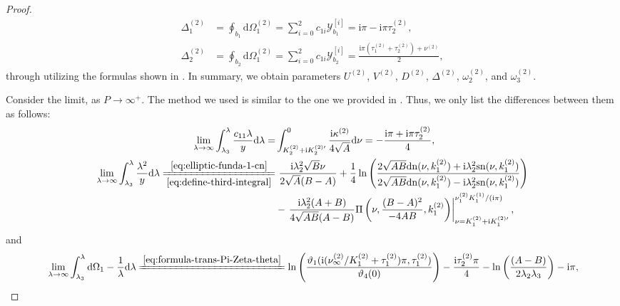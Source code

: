 \documentclass[11pt,reqno]{amsart}
\newcommand{\ii}{\mathrm{i}}
\newcommand{\sn}{\mathrm{sn}}
\newcommand{\dn}{\mathrm{dn}}
\newcommand{\dd}{\mathrm{d}}
\numberwithin{equation}{section}
\begin{document}
\begin{proof}
	\begin{equation}\nonumber
	\begin{split}
	\Delta_1^{(2)}&=\oint_{b_1}\dd\Omega_1^{(2)}=\sum_{i=0}^{2}c_{1i}\mathcal{Y}_{b_1}^{[i]}
	=\ii \pi -\ii \pi \tau^{(2)}_2 \! , \\
	\Delta_2^{(2)}&=\oint_{b_2}\dd\Omega_1^{(2)}
	=\sum_{i=0}^{2}c_{1i}\mathcal{Y}_{b_2}^{[i]}
	=\frac{ \ii \pi(\tau^{(2)}_1+\tau^{(2)}_2)+\nu^{(2)}}{2}, 
	\end{split}
	\end{equation}
	through utilizing the formulas shown in \cite{ByrdF-54}.
	In summary, we obtain parameters $U^{(2)}$, $V^{(2)}$, $D^{(2)}$, $\Delta^{(2)}$, $\omega_2^{(2)} $, and $\omega_3^{(2)}$.	
	
	Consider the limit, as $P\rightarrow \infty^{+}$. 
	The method we used is similar to the one we provided in . 
	Thus, we only list the differences between them as follows:
	\begin{equation}\nonumber
		\begin{split}
			\lim_{\lambda\rightarrow \infty}\int_{\lambda_3}^{\lambda}\frac{c_{11}\lambda}{y} \dd \lambda
			=& \int_{  K^{(2)}_2+\ii   K^{(2)\prime}_2}^{0}\frac{\ii \kappa^{(2)}}{4\sqrt{A}}\dd \nu
			=-\frac{\ii \pi+\ii \pi \tau^{(2)}_2}{4},\\
			\lim_{\lambda\rightarrow \infty} 
			\int_{\lambda_3}^{\lambda} \frac{\lambda^2}{y}\dd \lambda
			\xlongequal[\eqref{eq:define-third-integral}]{\eqref{eq:elliptic-funda-1-cn}} 
			& \ \frac{\ii \lambda_2^2\sqrt{B} \nu}{2\sqrt{A}(B-A)}+\frac{1}{4}\ln\left(\frac{2\sqrt{AB}\dn(\nu,  k^{(2)}_1)+\ii \lambda_2^2\sn(\nu,  k^{(2)}_1)}{2\sqrt{AB}\dn(\nu,  k^{(2)}_1)-\ii \lambda_2^2\sn(\nu,  k^{(2)}_1)}\right)\\
			&  -\left.\frac{\ii \lambda_2^2(A+B)}{4\sqrt{AB}(A-B)}\Pi\left(\nu,\frac{(B-A)^2}{-4AB},  k^{(2)}_1\right)\right|_{\nu=  K^{(2)}_1+\ii   K^{(2)\prime}_1}^{\nu^{(2)}_{1}K_1^{(1)}/(\ii \pi)},
		\end{split}
	\end{equation}
	and
	\begin{equation}\nonumber
		\begin{split}
			&\lim_{\lambda\rightarrow \infty}\int_{\lambda_3}^{\lambda} \dd \Omega_1-\frac{1}{\lambda}\dd \lambda 
			\xlongequal{\eqref{eq:formula-trans-Pi-Zeta-theta}} \ln\left(\frac{\vartheta_1(\ii( \nu^{(2)} _{\infty}/  K^{(2)}_1+ \tau^{(2)} _1)\pi,\tau_1^{(2)})}{\vartheta_4(0)}\right)-\frac{\ii \tau^{(2)}_2 \pi}{4} -\ln\left(\frac{(A-B)}{2\lambda_2\lambda_3}\right)-\ii\pi,\\

\end{split}
\end{equation}
\end{proof}
\end{document}
